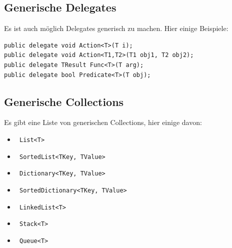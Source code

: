 \documentclass[
a4paper,
oneside,
10pt,
fleqn,
headsepline,
toc=listofnumbered, 
bibliography=totocnumbered]{scrartcl}
\begin{document}
\subsection{Generische Delegates}
Es ist auch möglich Delegates generisch zu machen. Hier einige Beispiele:
\begin{lstlisting}
public delegate void Action<T>(T i); 
public delegate void Action<T1,T2>(T1 obj1, T2 obj2); 
public delegate TResult Func<T>(T arg); 
public delegate bool Predicate<T>(T obj); 
\end{lstlisting}

\subsection{Generische Collections}
Es gibt eine Liste von generischen Collections, hier einige davon:

\begin{itemize}
	\item \lstinline| List<T> |
	\item \lstinline| SortedList<TKey, TValue> |
	\item \lstinline| Dictionary<TKey, TValue> |
	\item \lstinline| SortedDictionary<TKey, TValue> |
	\item \lstinline| LinkedList<T> |
	\item \lstinline| Stack<T>|
	\item \lstinline| Queue<T>|
\end{itemize}
\end{document}
